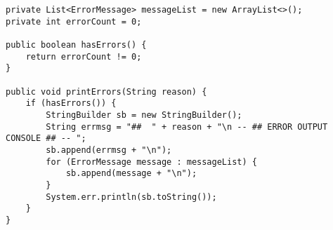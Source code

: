 \begin{lstlisting}[caption={Start of ErrorHandler class}, label={eh03}]
private List<ErrorMessage> messageList = new ArrayList<>();
private int errorCount = 0;

public boolean hasErrors() {
    return errorCount != 0;
}

public void printErrors(String reason) {
    if (hasErrors()) {
        StringBuilder sb = new StringBuilder();
        String errmsg = "##  " + reason + "\n -- ## ERROR OUTPUT CONSOLE ## -- ";
        sb.append(errmsg + "\n");
        for (ErrorMessage message : messageList) {
            sb.append(message + "\n");
        }
        System.err.println(sb.toString());
    }
}
\end{lstlisting}